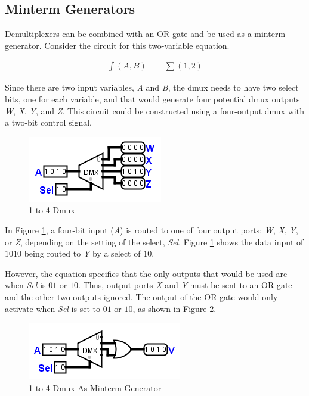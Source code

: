 \subsection{Minterm Generators}
\label{CL:subsec:minterm_generators}

Demultiplexers can be combined with an \textsf{OR} gate and be used as a minterm generator. Consider the circuit for this two-variable equation.

\begin{align}
  \label{CL:eq:2_var_minterm_gen}
  \int(A,B) &= \sum(1,2)
\end{align}

Since there are two input variables, \emph{A} and \emph{B}, the dmux needs to have two select bits, one for each variable, and that would generate four potential dmux outputs \emph{W}, \emph{X}, \emph{Y}, and \emph{Z}. This circuit could be constructed using a four-output dmux with a two-bit control signal.

\begin{figure}[H]
	\centering
	\includegraphics[width=\maxwidth{.95\linewidth}]{gfx/08_03}
	\caption{1-to-4 Dmux}
	\label{fig:08_03}
\end{figure}

In Figure \ref{fig:08_03}, a four-bit input (\emph{A}) is routed to one of four output ports: \emph{W}, \emph{X}, \emph{Y}, or \emph{Z}, depending on the setting of the select, \emph{Sel}. Figure \ref{fig:08_03} shows the data input of $ 1010 $ being routed to \emph{Y} by a select of $ 10 $.

However, the equation specifies that the only outputs that would be used are when \emph{Sel} is $ 01 $ or $ 10 $. Thus, output ports \emph{X} and \emph{Y} must be sent to an \textsf{OR} gate and the other two outputs ignored. The output of the \textsf{OR} gate would only activate when \emph{Sel} is set to $ 01 $ or $ 10 $, as shown in Figure \ref{fig:08_04}. 

\begin{figure}[H]
	\centering
	\includegraphics[width=\maxwidth{.95\linewidth}]{gfx/08_04}
	\caption{1-to-4 Dmux As Minterm Generator}
	\label{fig:08_04}
\end{figure}

